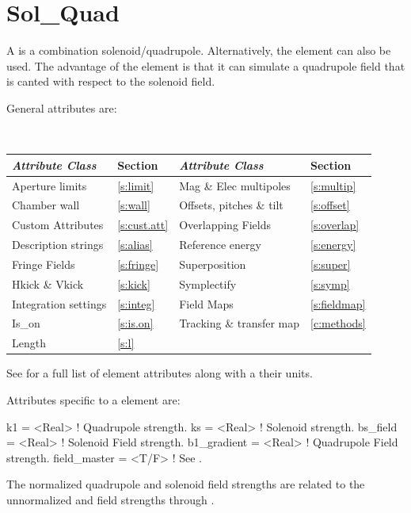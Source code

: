 {\newpage

\section{Sol_Quad}
\label{s:sq}

A  is a combination solenoid/quadrupole. Alternatively, the  element
can also be used. The advantage of the  element is that it can simulate a
quadrupole field that is canted with respect to the solenoid field.

General  attributes are:
\begin{center}
\tt
\begin{tabular}{llll} \toprule
  {\sl Attribute Class}      & Section           & {\sl Attribute Class}      & Section            \\ \midrule
  Aperture limits            & \ref{s:limit}     & Mag \& Elec multipoles     & \ref{s:multip}     \\
  Chamber wall               & \ref{s:wall}      & Offsets, pitches \& tilt   & \ref{s:offset}     \\
  Custom Attributes          & \ref{s:cust.att}  & Overlapping Fields         & \ref{s:overlap}    \\
  Description strings        & \ref{s:alias}     & Reference energy           & \ref{s:energy}     \\ 
  Fringe Fields              & \ref{s:fringe}    & Superposition              & \ref{s:super}      \\
  Hkick \& Vkick             & \ref{s:kick}      & Symplectify                & \ref{s:symp}       \\
  Integration settings       & \ref{s:integ}     & Field Maps                 & \ref{s:fieldmap}   \\
  Is_on                      & \ref{s:is.on}     & Tracking \& transfer map   & \ref{c:methods}    \\ 
  Length                     & \ref{s:l}         &                            &                    \\ 
  \bottomrule
\end{tabular}
\end{center}
\toffset
See  for a full list of element attributes along with a their units.

Attributes specific to a  element are:
\begin{example}
  k1           = <Real>    ! Quadrupole strength.
  ks           = <Real>    ! Solenoid strength.
  bs_field     = <Real>    ! Solenoid Field strength.
  b1_gradient  = <Real>    ! Quadrupole Field strength.
  field_master = <T/F>     ! See .
\end{example}
The normalized quadrupole  and solenoid  field strengths are related to the
unnormalized  and  field strengths through .

}
